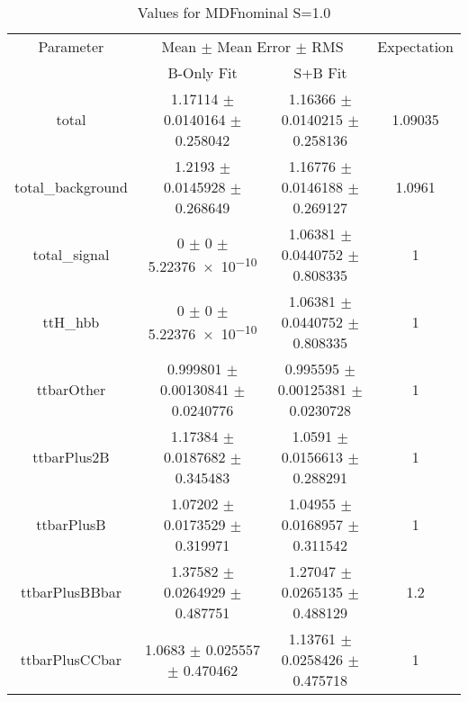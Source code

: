 \begin{table}
\centering
\caption{Values for MDFnominal S=1.0}
\begin{tabular}{cccc}
\toprule
Parameter & \multicolumn{2}{c}{Mean $\pm$ Mean Error $\pm$ RMS} & Expectation\\
 & B-Only Fit & S+B Fit & \\
\midrule
total & \num{1.17114} $\pm$ \num{0.0140164} $\pm$ \num{0.258042} & \num{1.16366} $\pm$ \num{0.0140215} $\pm$ \num{0.258136} & \num{1.09035}\\
total\_background & \num{1.2193} $\pm$ \num{0.0145928} $\pm$ \num{0.268649} & \num{1.16776} $\pm$ \num{0.0146188} $\pm$ \num{0.269127} & \num{1.0961}\\
total\_signal & \num{0} $\pm$ \num{0} $\pm$ \num{5.22376e-10} & \num{1.06381} $\pm$ \num{0.0440752} $\pm$ \num{0.808335} & \num{1}\\
ttH\_hbb & \num{0} $\pm$ \num{0} $\pm$ \num{5.22376e-10} & \num{1.06381} $\pm$ \num{0.0440752} $\pm$ \num{0.808335} & \num{1}\\
ttbarOther & \num{0.999801} $\pm$ \num{0.00130841} $\pm$ \num{0.0240776} & \num{0.995595} $\pm$ \num{0.00125381} $\pm$ \num{0.0230728} & \num{1}\\
ttbarPlus2B & \num{1.17384} $\pm$ \num{0.0187682} $\pm$ \num{0.345483} & \num{1.0591} $\pm$ \num{0.0156613} $\pm$ \num{0.288291} & \num{1}\\
ttbarPlusB & \num{1.07202} $\pm$ \num{0.0173529} $\pm$ \num{0.319971} & \num{1.04955} $\pm$ \num{0.0168957} $\pm$ \num{0.311542} & \num{1}\\
ttbarPlusBBbar & \num{1.37582} $\pm$ \num{0.0264929} $\pm$ \num{0.487751} & \num{1.27047} $\pm$ \num{0.0265135} $\pm$ \num{0.488129} & \num{1.2}\\
ttbarPlusCCbar & \num{1.0683} $\pm$ \num{0.025557} $\pm$ \num{0.470462} & \num{1.13761} $\pm$ \num{0.0258426} $\pm$ \num{0.475718} & \num{1}\\
\bottomrule
\end{tabular}
\end{table}